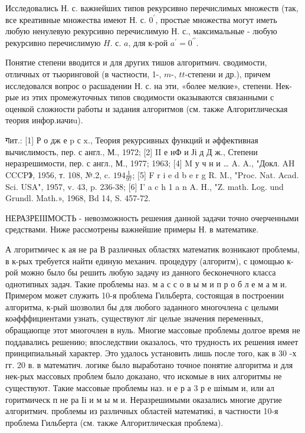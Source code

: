\documentclass[10pt]{article}
\begin{document}
Исследовались Н. с. важнейших типов рекурсивно перечислимых множеств (так, все креативные множества имеют Н. с. $0^{\prime}$, простые множества могут иметь любую ненулевую рекурсивно перечислимую Н. с., максимальные - любую рекурсивно перечислимую $H$. с. $a$, для к-рой $a^{\prime}=0^{\prime \prime}$.



Понятие степени вводится и для других тишов алгоритмич. сводимости, отличных от тьюринговой (в частности, 1-, $m$-, $t t$-степени и др.), причем исследовался вопрос о расшадении Н. с. на эти, «более мелкие», степени. Нек-рые из этих промежуточных типов сводимости оказываются связанными с оценкой сложности работы и задания алгоритмов (см. также Алгоритлическая теория инфор.иачиu).



गит.: [1] Р о дж е p с $\mathrm{x} .$, Теория рекурсивных функций и әффективная вычислимость, пер. с англ., М., 1972; [2] II е нФ и Јі д Д ж., Степени неразрешимости, пер. с англ., М., 1977; 1963; [4] M у ч н и … A. A., "Докл. AH CCCP》, 1956, т. 108, №.2, c. $194 \frac{1}{97}$; [5] F r i e d b e r g R. M., "Proc. Nat. Acad. Sci. USA", 1957, v. 43, p. 236-38; [6] I' a c h 1 a n A. H., "Z. math. Log. und Grundl. Math.», 1968, Bd 14, S. 457-72.



НЕРАЗРЕІІІМОСТЬ - невозможность решения данной задачи точно очерченными средствами. Ниже рассмотрены важнейшие примеры $Н$. в математике.



А лгоритмичес к ая не ра В различных областях математик возникают проблемы, в к-рых требуется найти единую механич. процедуру (алгоритм), с цомощью к-рой можно было бы решить любую задачу из данного бесконечного класса однотипных задач. Такие проблемы наз. м а с с о в ы м и п р о б л е м а м и. Примером может служить 10-я проблема Гильберта, состоящая в построении алгоритма, к-рый шозволил бы для любого заданного многочлена с целыми коәфффициентами узнать, существуют ліг целые значения переменных, обращаюпце этот многочлен в нуль. Многие массовые проблемы долгое время не поддавались решению; впоследствии оказалось, что трудность их решения имеет принципиальный характер. Это удалось установить лишь после того, как в 30 -х гг. 20 в. в математич. логике было выработано точное понятие алгоритма и для нек-рых массовых проблем было доказано, что искомые в них алгоритмы не существуют. Такие массовые проблемы наз. н е р а 3 р е шімым и, или ал горитмическ п не ра Іі и м ы м и. Неразрешимыми оказались многие другие алгоритмич. проблемы из различных областей математикі, в частности 10-я проблема Гильберта (см. также Алгоритлическая проблема).
\end{document}
